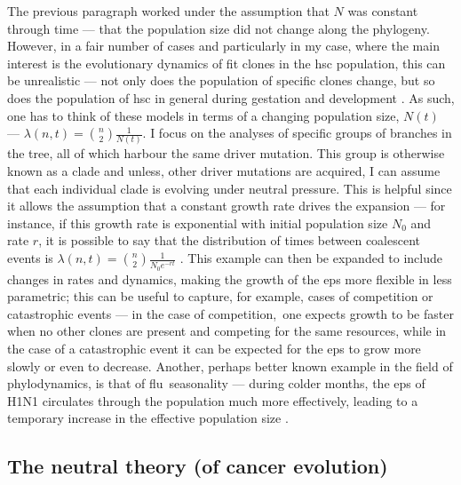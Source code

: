 The previous paragraph worked under the assumption that $N$ was constant through time --- that the population size did not change along the phylogeny. However, in a fair number of cases and particularly in my case, where the main interest is the evolutionary dynamics of fit clones in the \ac{hsc} population, this can be unrealistic --- not only does the population of specific clones change, but so does the population of \ac{hsc} in general during gestation and development \cite{Lee-Six2018-lp}. As such, one has to think of these models in terms of a changing population size, $N(t)$ --- $\lambda(n,t) = \binom{n}{2}\frac{1}{N(t)}$. I focus on the analyses of specific groups of branches in the tree, all of which harbour the same driver mutation. This group is otherwise known as a clade and unless, other driver mutations are acquired, I can assume that each individual clade is evolving under neutral pressure. This is helpful since it allows the assumption that a constant growth rate drives the expansion --- for instance, if this growth rate is exponential with initial population size $N_0$ and rate $r$, it is possible to say that the distribution of times between coalescent events is $\lambda(n,t) = \binom{n}{2}\frac{1}{N_0 e^{-rt}}$ \cite{Volz2013-ey}. This example can then be expanded to include changes in rates and dynamics, making the growth of the \ac{eps} more flexible in less parametric; this can be useful to capture, for example, cases of competition or catastrophic events --- in the case of competition, one expects growth to be faster when no other clones are present and competing for the same resources, while in the case of a catastrophic event it can be expected for the \ac{eps} to grow more slowly or even to decrease. Another, perhaps better known example in the field of phylodynamics, is that of flu seasonality --- during colder months, the \ac{eps} of H1N1 circulates through the population much more effectively, leading to a temporary increase in the effective population size \cite{Karcher2020-bg}.

\subsection{The neutral theory (of cancer evolution)}

